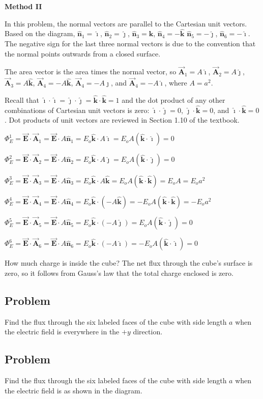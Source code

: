 \documentclass{article}
\newcommand{\ihat}[0]{\hat{\boldsymbol{\imath}}}
\newcommand{\jhat}[0]{\hat{\boldsymbol{\jmath}}}
\newcommand{\khat}[0]{\hat{\boldsymbol{k}}}
\newcommand{\bfvec}[1]{\vec{\mathbf{#1}}}
\begin{document}
\textbf{Method II}

In this problem, the normal vectors are parallel to the Cartesian unit vectors. Based on the diagram, $\hat{\mathbf{n}}_1=\ihat$, $\hat{\mathbf{n}}_2=\jhat$, $\hat{\mathbf{n}}_3=\khat$, $\hat{\mathbf{n}}_4=-\khat$
$\hat{\mathbf{n}}_5=-\jhat$, $\hat{\mathbf{n}}_6=-\ihat$. The negative sign for the last three normal vectors is due to the convention that the normal points outwards from a closed surface.

The area vector is the area times the normal vector, so $\bfvec{A}_1=A\ihat$, $\bfvec{A}_2=A\jhat$, $\bfvec{A}_3=A\khat$, $\bfvec{A}_4=-A\khat$, $\bfvec{A}_4=-A\jhat$, and $\bfvec{A}_4=-A\ihat$, where $A=a^2$.

Recall that $\ihat\cdot\ihat=\jhat\cdot\jhat=\khat\cdot\khat=1$ and the dot product of any other combinations of Cartesian unit vectors is zero: $\ihat\cdot\jhat=0$, $\jhat\cdot\khat=0$, and $\ihat\cdot\khat=0$. Dot products of unit vectors are reviewed in Section 1.10 of the textbook.

$\Phi_E^{1}=\bfvec{E}\cdot \bfvec{A}_1=\bfvec{E}\cdot A\hat{\mathbf{n}}_1=E_o\khat\cdot A\ihat=E_oA(\khat\cdot \ihat)=0$

$\Phi_E^{2}=\bfvec{E}\cdot \bfvec{A}_2=\bfvec{E}\cdot A\hat{\mathbf{n}}_2=E_o\hat{\mathbf{k}}\cdot A\jhat=E_oA(\khat\cdot \jhat)=0$

$\Phi_E^{3}=\bfvec{E}\cdot \bfvec{A}_3=\bfvec{E}\cdot A\hat{\mathbf{n}}_3=E_o\hat{\mathbf{k}}\cdot A\khat=E_oA(\khat\cdot\khat)=E_oA=E_oa^2$

$\Phi_E^{4}=\bfvec{E}\cdot \bfvec{A}_4=\bfvec{E}\cdot A\hat{\mathbf{n}}_4=E_o\hat{\mathbf{k}}\cdot (-A\khat)=-E_oA(\khat\cdot\khat)=-E_oa^2$

$\Phi_E^{5}=\bfvec{E}\cdot \bfvec{A}_5=\bfvec{E}\cdot A\hat{\mathbf{n}}_5=E_o\hat{\mathbf{k}}\cdot (-A\jhat)=E_oA(\khat\cdot\jhat)=0$

$\Phi_E^{6}=\bfvec{E}\cdot \bfvec{A}_6=\bfvec{E}\cdot A\hat{\mathbf{n}}_6=E_o\hat{\mathbf{k}}\cdot (-A\ihat)=-E_oA(\khat\cdot\ihat)=0$

How much charge is inside the cube? The net flux through the cube's surface is zero, so it follows from Gauss's law that the total charge enclosed is zero.

\newpage

\subsection{Problem}



Find the flux through the six labeled faces of the cube with side length $a$ when the electric field is everywhere in the $+y$ direction.

\vskip 120.44999999999999pt

\subsection{Problem}



Find the flux through the six labeled faces of the cube with side length $a$ when the electric field is as shown in the diagram.
\end{document}
